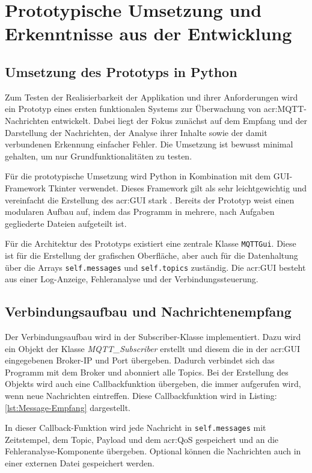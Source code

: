 \section{Prototypische Umsetzung und Erkenntnisse aus der Entwicklung}
    \subsection{Umsetzung des Prototyps in Python}
        Zum Testen der Realisierbarkeit der Applikation und ihrer Anforderungen wird ein Prototyp eines ersten funktionalen Systems zur Überwachung von \acrshort{acr:MQTT}-Nachrichten entwickelt. Dabei liegt der Fokus zunächst auf dem Empfang und der Darstellung der Nachrichten, der Analyse ihrer Inhalte sowie der damit verbundenen Erkennung einfacher Fehler. Die Umsetzung ist bewusst minimal gehalten, um nur Grundfunktionalitäten zu testen.

        Für die prototypische Umsetzung wird Python in Kombination mit dem GUI-Framework Tkinter verwendet. Dieses Framework gilt als sehr leichtgewichtig und vereinfacht die Erstellung des \acrshort{acr:GUI} stark \autocite{TkinterPythonInterface}. Bereits der Prototyp weist einen modularen Aufbau auf, indem das Programm in mehrere, nach Aufgaben gegliederte Dateien aufgeteilt ist. 

        Für die Architektur des Prototyps existiert eine zentrale Klasse \lstinline{MQTTGui}. Diese ist für die Erstellung der grafischen Oberfläche, aber auch für die Datenhaltung über die Arrays \lstinline{self.messages} und \lstinline{self.topics} zuständig. Die \acrshort{acr:GUI} besteht aus einer Log-Anzeige, Fehleranalyse und der Verbindungssteuerung. 

        \subsection{Verbindungsaufbau und Nachrichtenempfang}
        Der Verbindungsaufbau wird in der Subscriber-Klasse implementiert. Dazu wird ein Objekt der Klasse \textit{MQTT\_Subscriber} erstellt und diesem die in der \acrshort{acr:GUI} eingegebenen Broker-IP und Port übergeben. Dadurch verbindet sich das Programm mit dem Broker und abonniert alle Topics. Bei der Erstellung des Objekts wird auch eine Callbackfunktion übergeben, die immer aufgerufen wird, wenn neue Nachrichten eintreffen. Diese Callbackfunktion wird in Listing: \ref{lst:Message-Empfang} dargestellt. 

        In dieser Callback-Funktion wird jede Nachricht in \lstinline{self.messages} mit Zeitstempel, dem Topic, Payload und dem \acrshort{acr:QoS} gespeichert und an die Fehleranalyse-Komponente übergeben. Optional können die Nachrichten auch in einer externen Datei gespeichert werden.

